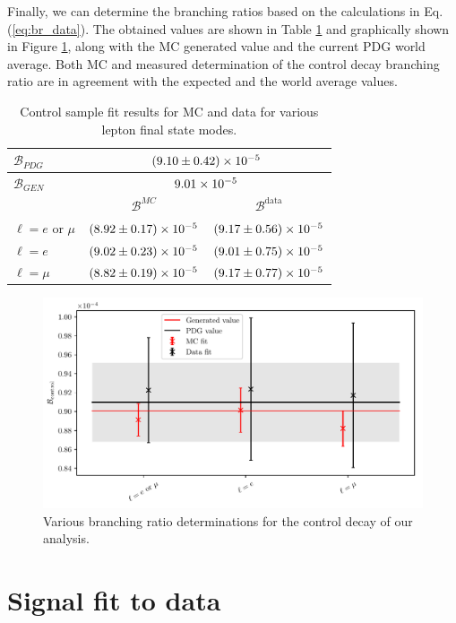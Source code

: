 Finally, we can determine the branching ratios based on the calculations in Eq. (\ref{eq:br_data}). The obtained values are shown in Table \ref{tab:br_result} and graphically shown in Figure \ref{fig:br_plot}, along with the MC generated value and the current PDG world average. Both MC and measured determination of the control decay branching ratio are in agreement with the expected and the world average values.

\begin{table}[H]
	\centering
	\begin{tabular}{|l|c|c|}
		\hline
		$\mathcal{B}_{PDG}$ & \multicolumn{2}{c|}{$(9.10\pm0.42)\times 10^{-5}$} \\
		\hline
     	$\mathcal{B}_{GEN}$ & \multicolumn{2}{c|}{$9.01\times 10^{-5}$} \\
     	\hline
		& $\mathcal{B}^{MC}$ & $\mathcal{B}^{\mathrm{data}}$ \\
		\hline
		$\ell = e$ or $\mu$ & $(8.92\pm0.17)\times 10^{-5}$ & $(9.17\pm0.56)\times 10^{-5}$\\
		\hline
		$\ell = e$ & $(9.02\pm0.23)\times 10^{-5}$ & $(9.01\pm0.75)\times 10^{-5}$ \\
		\hline
		$\ell = \mu$ & $(8.82\pm0.19)\times 10^{-5}$ & $(9.17\pm0.77)\times 10^{-5}$\\
		\hline
	\end{tabular}
	\caption{Control sample fit results for MC and data for various lepton final state modes.}
	\label{tab:br_result}
\end{table}

\begin{figure}[H]
	\centering
	\captionsetup{width=0.8\linewidth}
	\includegraphics[width=\linewidth]{fig/br_plot}
	\caption{Various branching ratio determinations for the control decay of our analysis.}
	\label{fig:br_plot}
\end{figure}

\section{Signal fit to data}